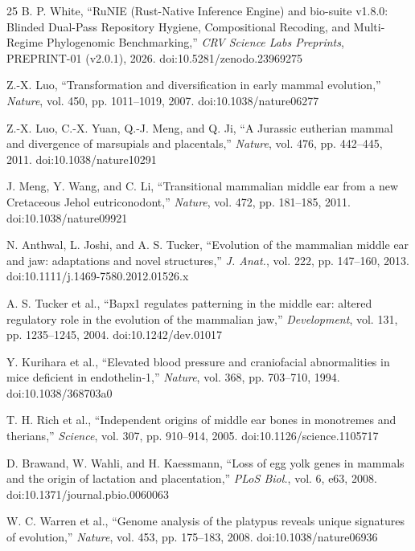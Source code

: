 \documentclass[10pt,letterpaper]{article}
\begin{document}
\begin{thebibliography}{25}
B. P. White, ``RuNIE (Rust-Native Inference Engine) and bio-suite v1.8.0: Blinded Dual-Pass Repository Hygiene, Compositional Recoding, and Multi-Regime Phylogenomic Benchmarking,'' \emph{CRV Science Labs Preprints}, PREPRINT-01 (v2.0.1), 2026. doi:10.5281/zenodo.23969275

Z.-X. Luo, ``Transformation and diversification in early mammal evolution,'' \emph{Nature}, vol. 450, pp. 1011--1019, 2007. doi:10.1038/nature06277

Z.-X. Luo, C.-X. Yuan, Q.-J. Meng, and Q. Ji, ``A Jurassic eutherian mammal and divergence of marsupials and placentals,'' \emph{Nature}, vol. 476, pp. 442--445, 2011. doi:10.1038/nature10291

J. Meng, Y. Wang, and C. Li, ``Transitional mammalian middle ear from a new Cretaceous Jehol eutriconodont,'' \emph{Nature}, vol. 472, pp. 181--185, 2011. doi:10.1038/nature09921

N. Anthwal, L. Joshi, and A. S. Tucker, ``Evolution of the mammalian middle ear and jaw: adaptations and novel structures,'' \emph{J. Anat.}, vol. 222, pp. 147--160, 2013. doi:10.1111/j.1469-7580.2012.01526.x

A. S. Tucker et al., ``Bapx1 regulates patterning in the middle ear: altered regulatory role in the evolution of the mammalian jaw,'' \emph{Development}, vol. 131, pp. 1235--1245, 2004. doi:10.1242/dev.01017

Y. Kurihara et al., ``Elevated blood pressure and craniofacial abnormalities in mice deficient in endothelin-1,'' \emph{Nature}, vol. 368, pp. 703--710, 1994. doi:10.1038/368703a0

T. H. Rich et al., ``Independent origins of middle ear bones in monotremes and therians,'' \emph{Science}, vol. 307, pp. 910--914, 2005. doi:10.1126/science.1105717

D. Brawand, W. Wahli, and H. Kaessmann, ``Loss of egg yolk genes in mammals and the origin of lactation and placentation,'' \emph{PLoS Biol.}, vol. 6, e63, 2008. doi:10.1371/journal.pbio.0060063

W. C. Warren et al., ``Genome analysis of the platypus reveals unique signatures of evolution,'' \emph{Nature}, vol. 453, pp. 175--183, 2008. doi:10.1038/nature06936


\end{thebibliography}
\end{document}
